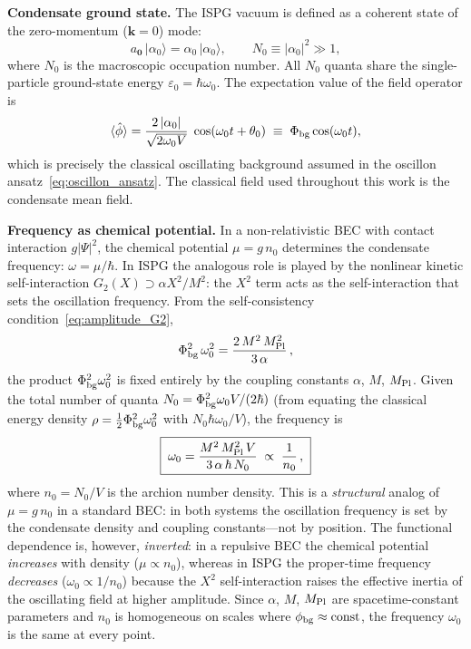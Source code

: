 \documentclass[11pt]{article}
\begin{document}
\medskip
\textbf{Condensate ground state.}
The ISPG vacuum is defined as a coherent state of the
zero-momentum ($\mathbf{k}=0$) mode:
\begin{equation}
  a_{\mathbf{0}}\,|\alpha_0\rangle
  = \alpha_0\,|\alpha_0\rangle,
  \qquad
  N_0 \equiv |\alpha_0|^2 \gg 1,
  \label{eq:coherent_state}
\end{equation}
where $N_0$ is the macroscopic occupation number.  All
$N_0$ quanta share the single-particle ground-state
energy $\varepsilon_0 = \hbar\omega_0$.  The expectation
value of the field operator is
\begin{equation}
  \langle\hat\phi\rangle
  = \frac{2\,|\alpha_0|}{\sqrt{2\omega_0 V}}\;
    \cos(\omega_0 t + \theta_0)
  \;\equiv\;
  \Phi_{\rm bg}\cos(\omega_0 t),
  \label{eq:mean_field}
\end{equation}
which is precisely the classical oscillating background
assumed in the oscillon ansatz~\eqref{eq:oscillon_ansatz}.
The classical field used throughout this work is the
condensate mean field.

\medskip
\textbf{Frequency as chemical potential.}
In a non-relativistic BEC with contact interaction
$g|\Psi|^2$, the chemical potential $\mu = g\,n_0$
determines the condensate frequency: $\omega = \mu/\hbar$.
In ISPG the analogous role is played by the nonlinear
kinetic self-interaction
$G_2(X) \supset \alpha X^2/M^2$: the $X^2$ term acts
as the self-interaction that sets the oscillation
frequency.  From the self-consistency
condition~\eqref{eq:amplitude_G2},
\begin{equation}
  \Phi_{\rm bg}^2\,\omega_0^2
  = \frac{2\,M^2\,M_{\rm Pl}^2}{3\,\alpha}\,,
  \label{eq:self_consistency_condensate}
\end{equation}
the product $\Phi_{\rm bg}^2\omega_0^2$ is fixed
entirely by the coupling constants $\alpha$, $M$,
$M_{\rm Pl}$.  Given the total number of quanta
$N_0 = \Phi_{\rm bg}^2\omega_0 V/(2\hbar)$ (from
equating the classical energy density
$\rho = \tfrac{1}{2}\Phi_{\rm bg}^2\omega_0^2$ with
$N_0\hbar\omega_0/V$), the frequency is
\begin{equation}
  \boxed{\;
  \omega_0
  = \frac{M^2\,M_{\rm Pl}^2\,V}
         {3\,\alpha\,\hbar\,N_0}
  \;\propto\; \frac{1}{n_0}\,,
  \;}
  \label{eq:omega0_condensate}
\end{equation}
where $n_0 = N_0/V$ is the archion number density.
This is a \emph{structural} analog of $\mu = g\,n_0$ in a
standard BEC: in both systems the oscillation frequency is
set by the condensate density and coupling constants---not
by position.  The functional dependence is, however,
\emph{inverted}: in a repulsive BEC the chemical potential
\emph{increases} with density ($\mu \propto n_0$), whereas
in ISPG the proper-time frequency \emph{decreases}
($\omega_0 \propto 1/n_0$) because the $X^2$
self-interaction raises the effective inertia of the
oscillating field at higher amplitude.  Since $\alpha$, $M$, $M_{\rm Pl}$ are
spacetime-constant parameters and $n_0$ is homogeneous on
scales where $\phi_{\rm bg} \approx \mathrm{const}$, the
frequency $\omega_0$ is the same at every point.
\end{document}

